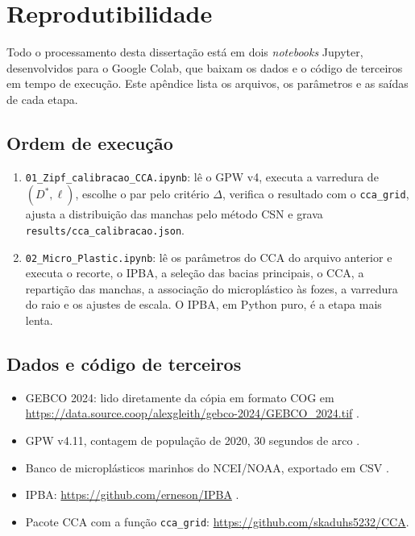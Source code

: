 \chapter{Reprodutibilidade}
\label{apendice:reprodutibilidade}

Todo o processamento desta dissertação está em dois \textit{notebooks} Jupyter, desenvolvidos para o Google Colab, que baixam os dados e o código de terceiros em tempo de execução. Este apêndice lista os arquivos, os parâmetros e as saídas de cada etapa.

\section{Ordem de execução}

\begin{enumerate}
	\item \texttt{01\_Zipf\_calibracao\_CCA.ipynb}: lê o GPW v4, executa a varredura de $(D^{*}, \ell)$, escolhe o par pelo critério $\Delta$, verifica o resultado com o \texttt{cca\_grid}, ajusta a distribuição das manchas pelo método CSN e grava \texttt{results/cca\_calibracao.json}.
	\item \texttt{02\_Micro\_Plastic.ipynb}: lê os parâmetros do CCA do arquivo anterior e executa o recorte, o IPBA, a seleção das bacias principais, o CCA, a repartição das manchas, a associação do microplástico às fozes, a varredura do raio e os ajustes de escala. O IPBA, em Python puro, é a etapa mais lenta.
\end{enumerate}

\section{Dados e código de terceiros}

\begin{itemize}
	\item GEBCO 2024: lido diretamente da cópia em formato COG em \url{https://data.source.coop/alexgleith/gebco-2024/GEBCO_2024.tif} \cite{gebco2024}.
	\item GPW v4.11, contagem de população de 2020, 30 segundos de arco \cite{gpw4}.
	\item Banco de microplásticos marinhos do NCEI/NOAA, exportado em CSV \cite{nyadjro2023}.
	\item IPBA: \url{https://github.com/erneson/IPBA} \cite{ipba}.
	\item Pacote CCA com a função \texttt{cca\_grid}: \url{https://github.com/skaduhs5232/CCA}.
\end{itemize}

